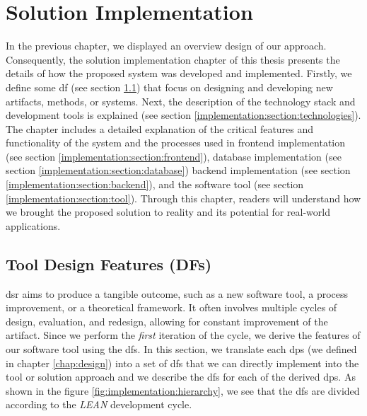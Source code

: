 
\chapter{Solution Implementation}

\ifpdf
    \graphicspath{{Chapters/Implementation/Figs/}{Chapters/Implementation/Figs/}{Chapters/Implementation/Figs/}}
\else
    \graphicspath{{Chapters/Implementation/Figs/}{Chapters/Implementation/Figs/}}
\fi
In the previous chapter, we displayed an overview design of our approach.
Consequently, the solution implementation chapter of this thesis presents the details of how the proposed system was developed and implemented.
Firstly, we define some \ac{df} (see section \ref{implementation:section:designfeatures}) that focus on designing and developing new artifacts, methods, or systems.
Next, the description of the technology stack and development tools is explained (see section \ref{implementation:section:technologies}).
The chapter includes a detailed explanation of the critical features and functionality of the system and the processes used in frontend implementation (see section \ref{implementation:section:frontend}), database implementation (see section \ref{implementation:section:database}) backend implementation (see section \ref{implementation:section:backend}), and the software tool (see section \ref{implementation:section:tool}).
Through this chapter, readers will understand how we brought the proposed solution to reality and its potential for real-world applications.

\section{Tool Design Features (DFs)}
\label{implementation:section:designfeatures}
\ac{dsr} aims to produce a tangible outcome, such as a new software tool, a process improvement, or a theoretical framework.
It often involves multiple cycles of design, evaluation, and redesign, allowing for constant improvement of the artifact.
Since we perform the \textit{first} iteration of the cycle, we derive the features of our software tool using the \ac{df}s.
In this section, we translate each \ac{dp}s (we defined in chapter \ref{chap:design}) into a set of \ac{df}s that we can directly implement into the tool or solution approach and we describe the \ac{df}s for each of the derived \ac{dp}s.
As shown in the figure \ref{fig:implementation:hierarchy}, we see that the \ac{df}s are divided according to the \textit{LEAN} development cycle.
\clearpage

